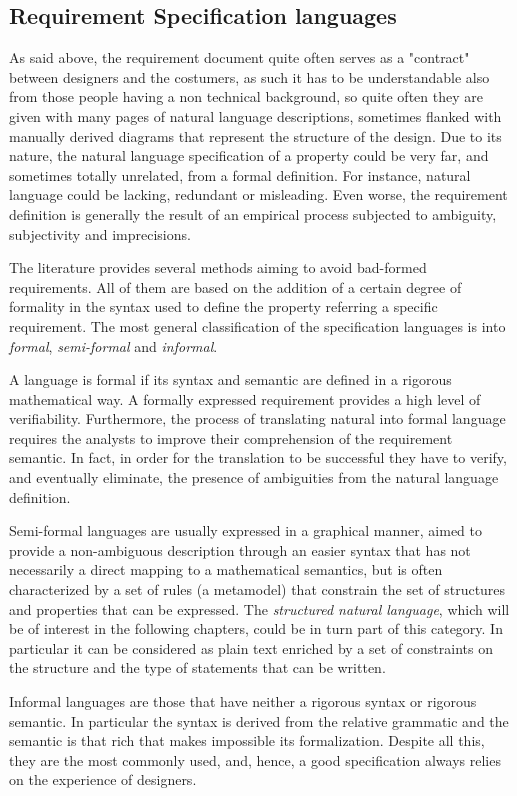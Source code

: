 \subsection{Requirement Specification languages}
As said above, the requirement document quite often serves as a "contract" between designers and the costumers, as such it has to be  understandable also from those people having a non technical background, so quite often they are given with many pages of natural language descriptions, sometimes flanked with manually derived diagrams that represent the structure of the design. Due to its nature, the natural language specification of a property could be very far, and sometimes totally unrelated, from a formal definition. For instance, natural language could be lacking, redundant or misleading. Even worse, the requirement definition is generally the result of an empirical process subjected to ambiguity, subjectivity and imprecisions.
\par The literature provides several methods aiming to avoid bad-formed requirements. All of them are based on the addition of a certain degree of formality in the syntax used to define the property referring a specific requirement. The most general classification of the specification languages is into \textit{formal}, \textit{semi-formal} and \textit{informal}.
\par A language is formal if its syntax and semantic are defined in a rigorous mathematical way. A formally expressed requirement provides a high level of verifiability. Furthermore, the process of translating natural into formal language requires the analysts to improve their comprehension of the requirement semantic. In fact, in order for the translation to be successful they have to verify, and eventually eliminate, the presence of ambiguities from the natural language definition.
\par Semi-formal languages are usually expressed in a graphical manner, aimed to provide a non-ambiguous description through an easier syntax that has not necessarily a direct mapping to a mathematical semantics, but is often characterized by a set of rules (a metamodel) that constrain the set of structures and properties that can be expressed. The \textit{structured natural language}, which will be of interest in the following chapters, could be in turn part of this category. In particular it can be considered as plain text enriched by a set of constraints on the structure and the type of statements that can be written.%
\par Informal languages are those that have neither a rigorous syntax or rigorous semantic. In particular the syntax is derived from the relative grammatic and the semantic is that rich that makes impossible its formalization. Despite all this, they are the most commonly used, and, hence, a good specification always relies on the experience of designers.

